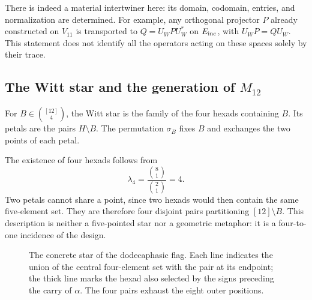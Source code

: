 There is indeed a material intertwiner here: its domain, codomain,
entries, and normalization are determined. For example, any
orthogonal projector $P$ already constructed on $V_{11}$ is transported to
$Q=U_WPU_W^*$ on $E_{\rm inc}$, with
$U_WP=QU_W$. This statement does not identify all the
operators acting on these spaces solely by their trace.



\subsection{The Witt star and the generation of \texorpdfstring{$M_{12}$}{M12}}
\label{exc:estrella}

\begin{definition}
\label{exc:def-estrella}
For $B\in\binom{[12]}4$, the Witt star is the family of the
four hexads containing $B$. Its petals are the pairs $H\setminus B$.
The permutation $\sigma_B$ fixes $B$ and exchanges the two points of each
petal.
\end{definition}

The existence of four hexads follows from
\[
 \lambda_4=\frac{\binom81}{\binom21}=4.
\]
Two petals cannot share a point, since two hexads would then
contain the same five-element set. They are therefore four disjoint pairs
partitioning $[12]\setminus B$. This description is neither a five-pointed
star nor a geometric metaphor: it is a four-to-one incidence
of the design.

\begin{figure}[htbp]
\centering
{}
\caption{The concrete star of the dodecaphasic flag. Each line
indicates the union of the central four-element set with the pair at its endpoint; the
thick line marks the hexad also selected by the signs
preceding the carry of $\alpha$. The four pairs exhaust the eight
outer positions.}
\label{exc:fig-estrella}
\end{figure}

